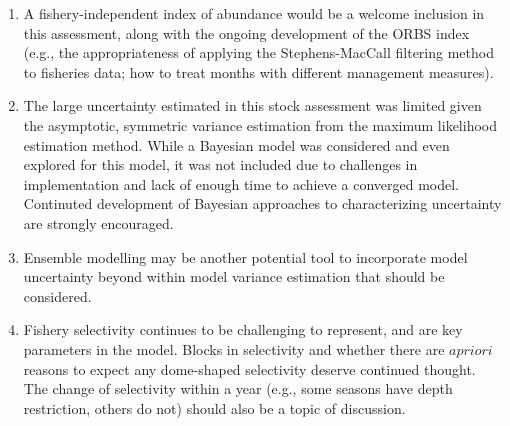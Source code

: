 \documentclass[11pt,
  english,
  a4paper,
]{article}
\begin{document}
\begin{enumerate}
  \tagmcend\tagstructend\tagstructend
\item

  A fishery-independent index of abundance would be a welcome inclusion in this assessment, along with the ongoing development of the ORBS index (e.g., the appropriateness of applying the Stephens-MacCall filtering method to fisheries data; how to treat months with different management measures).

  \tagmcend\tagstructend\tagstructend
\item

  The large uncertainty estimated in this stock assessment was limited given the asymptotic, symmetric variance estimation from the maximum likelihood estimation method. While a Bayesian model was considered and even explored for this model, it was not included due to challenges in implementation and lack of enough time to achieve a converged model. Continuted development of Bayesian approaches to characterizing uncertainty are strongly encouraged.

  \tagmcend\tagstructend\tagstructend
\item

  Ensemble modelling may be another potential tool to incorporate model uncertainty beyond within model variance estimation that should be considered.

  \tagmcend\tagstructend\tagstructend
\item

  Fishery selectivity continues to be challenging to represent, and are key parameters in the model. Blocks in selectivity and whether there are {\(a priori\)\leavevmode\tagmcend\tagstructend} reasons to expect any dome-shaped selectivity deserve continued thought. The change of selectivity within a year (e.g., some seasons have depth restriction, others do not) should also be a topic of discussion.

  \tagmcend\tagstructend\tagstructend
\end{enumerate}

\tagstructend

\pagebreak
\setlength{\parskip}{5mm plus1mm minus1mm}
\setcounter{page}{1}
\renewcommand{\thefigure}{\arabic{figure}}
\renewcommand{\thetable}{\arabic{table}}
\setcounter{table}{0}
\setcounter{figure}{0}
\end{document}
